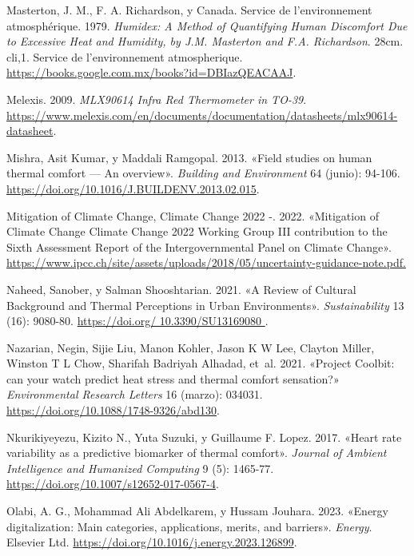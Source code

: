 \documentclass[
  12pt,
  letterpaper,
  DIV=11,
  numbers=noendperiod]{scrreport}
\newlength{\cslhangindent}
\newlength{\cslentryspacingunit} %
\newenvironment{CSLReferences}[2] %
 {%
  \setlength{\parindent}{0pt}
  \ifodd #1
  \let\oldpar\par
  \def\par{\hangindent=\cslhangindent\oldpar}
  \fi
  \setlength{\parskip}{#2\cslentryspacingunit}
 }%
 {}
\begin{document}
\begin{CSLReferences}{1}{0}
\leavevmode{}%
Masterton, J. M., F. A. Richardson, y Canada. Service de l'environnement
atmosphérique. 1979. \emph{Humidex: A Method of Quantifying Human
Discomfort Due to Excessive Heat and Humidity, by J.M. Masterton and
F.A. Richardson}. 28cm. cli,1. Service de l'environnement atmospherique.
\url{https://books.google.com.mx/books?id=DBIazQEACAAJ}.

\leavevmode{}%
Melexis. 2009. \emph{MLX90614 Infra Red Thermometer in TO-39}.
\url{https://www.melexis.com/en/documents/documentation/datasheets/mlx90614-datasheet}.

\leavevmode{}%
Mishra, Asit Kumar, y Maddali Ramgopal. 2013. {«Field studies on human
thermal comfort --- An overview»}. \emph{Building and Environment} 64
(junio): 94-106. \url{https://doi.org/10.1016/J.BUILDENV.2013.02.015}.

\leavevmode{}%
Mitigation of Climate Change, Climate Change 2022 -. 2022. {«Mitigation
of Climate Change Climate Change 2022 Working Group III contribution to
the Sixth Assessment Report of the Intergovernmental Panel on Climate
Change»}.
\url{https://www.ipcc.ch/site/assets/uploads/2018/05/uncertainty-guidance-note.pdf.}

\leavevmode{}%
Naheed, Sanober, y Salman Shooshtarian. 2021. {«A Review of Cultural
Background and Thermal Perceptions in Urban Environments»}.
\emph{Sustainability} 13 (16): 9080-80.
\href{https://doi.org/\%2010.3390/SU13169080\%20}{https://doi.org/
10.3390/SU13169080 }.

\leavevmode{}%
Nazarian, Negin, Sijie Liu, Manon Kohler, Jason K W Lee, Clayton Miller,
Winston T L Chow, Sharifah Badriyah Alhadad, et~al. 2021. {«Project
Coolbit: can your watch predict heat stress and thermal comfort
sensation?»} \emph{Environmental Research Letters} 16 (marzo): 034031.
\url{https://doi.org/10.1088/1748-9326/abd130}.

\leavevmode{}%
Nkurikiyeyezu, Kizito N., Yuta Suzuki, y Guillaume F. Lopez. 2017.
{«Heart rate variability as a predictive biomarker of thermal comfort»}.
\emph{Journal of Ambient Intelligence and Humanized Computing} 9 (5):
1465-77. \url{https://doi.org/10.1007/s12652-017-0567-4}.

\leavevmode{}%
Olabi, A. G., Mohammad Ali Abdelkarem, y Hussam Jouhara. 2023. {«Energy
digitalization: Main categories, applications, merits, and barriers»}.
\emph{Energy}. Elsevier Ltd.
\url{https://doi.org/10.1016/j.energy.2023.126899}.


\end{CSLReferences}
\end{document}
